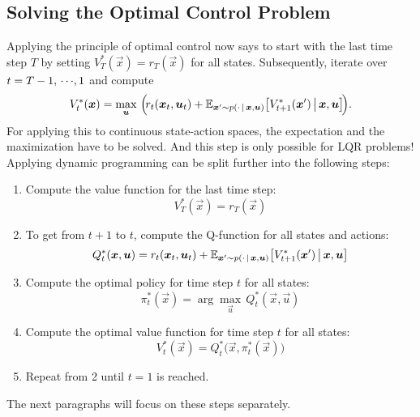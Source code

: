 			\subsection{Solving the Optimal Control Problem}
				Applying the principle of optimal control now says to start with the last time step \(T\) by setting \( V_T^\ast(\vec{x}) = r_T(\vec{x}) \) for all states. Subsequently, iterate over \( t = T - 1,\,\cdots\!,1 \) and compute
				\begin{equation*}
					V_t^\ast(\bm{x}) = \max_{\bm{u}} \, \Big(\! r_t(\bm{x}_t, \bm{u}_t) + \mathbb{E}_{\bm{x}' \sim p(\cdot \,\vert\, \bm{x}, \bm{u})}\big[ V_{t + 1}^\ast(\bm{x}') \,\big\vert\, \bm{x}, \bm{u} \big] \!\Big).
				\end{equation*}
				For applying this to continuous state-action spaces, the expectation and the maximization have to be solved. And this step is only possible for LQR problems! Applying dynamic programming can be split further into the following steps:
				\begin{enumerate}
					\item Compute the value function for the last time step:
						\begin{equation*}
							V_T^\ast(\vec{x}) = r_T(\vec{x})
						\end{equation*}
					\item To get from \(t + 1\) to \(t\), compute the Q-function for all states and actions:
						\begin{equation*}
							Q_t^\ast(\bm{x}, \bm{u}) = r_t(\bm{x}_t, \bm{u}_t) + \mathbb{E}_{\bm{x}' \sim p(\cdot \,\vert\, \bm{x}, \bm{u})}\big[ V_{t + 1}^\ast(\bm{x}') \,\big\vert\, \bm{x}, \bm{u} \big]
						\end{equation*}
					\item Compute the optimal policy for time step \(t\) for all states:
						\begin{equation*}
							\pi_t^\ast(\vec{x}) = \arg\max_{\vec{u}} \, Q_t^\ast(\vec{x}, \vec{u})
						\end{equation*}
					\item Compute the optimal value function for time step \(t\) for all states:
						\begin{equation*}
							V_t^\ast(\vec{x}) = Q_t^\ast\big(\vec{x}, \pi_t^\ast(\vec{x})\big)
						\end{equation*}
					\item Repeat from 2 until \( t = 1 \) is reached.
				\end{enumerate}
				The next paragraphs will focus on these steps separately.

